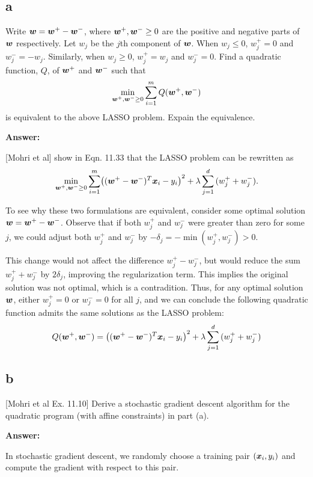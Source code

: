 \documentclass{article}
\begin{document}
\subsection{a}
Write $\bm{w} = \bm{w}^{+} - \bm{w}^{-}$, where $\bm{w}^{+}, \bm{w}^{-} \geq 0$ are the positive and negative parts of $\bm{w}$ respectively.
Let $w_j$ be the $j$th component of $\bm{w}$.
When $w_j \leq 0$, $w_j^{+} = 0$ and $w_j^{-} = -w_j$.
Similarly, when $w_j \geq 0$, $w_j^{+} = w_j$ and $w_j^{-} = 0$.
Find a quadratic function, $Q$, of $\bm{w}^{+}$ and $\bm{w}^{-}$ such that
$$\min_{\bm{w}^{+},\bm{w}^{-} \geq 0}\sum_{i=1}^m{Q(\bm{w}^{+}, \bm{w}^{-})}$$
is equivalent to the above LASSO problem.
Expain the equivalence.

\textbf{Answer:}

[Mohri et al] show in Eqn. 11.33 that the LASSO problem can be rewritten as
$$\min_{\vct{w}^{+},\vct{w}^{-} \geq 0}\sum_{i=1}^{m}\left((\vct{w}^{+} - \vct{w}^{-})^T\vct{x}_i - y_i\right)^2 + \lambda\sum_{j=1}^d{(w_j^{+} + w_j^{-})}.$$

To see why these two formulations are equivalent, consider some optimal solution $\bm{w} = \bm{w}^{+} - \bm{w}^{-}$.
Observe that if both $w^{+}_j$ and $w^{-}_j$ were greater than zero for some $j$, we could adjust both $w^{+}_j$ and $w^{-}_j$ by $-\delta_j = -\min(w^{+}_j, w^{-}_j) > 0$.

This change would not affect the difference $w^{+}_j - w^{-}_j$, but would reduce the sum $w^{+}_j + w^{-}_j$ by $2\delta_j$, improving the regularization term.
This implies the original solution was not optimal, which is a contradition.
Thus, for any optimal solution $\bm{w}$, either $w^{+}_j = 0$ or $w^{-}_j = 0$ for all $j$, and we can conclude the following quadratic function admits the same solutions as the LASSO problem:
$$Q(\vct{w}^{+}, \vct{w}^{-}) = \left((\vct{w}^{+} - \vct{w}^{-})^T\vct{x}_i - y_i\right)^2 + \lambda\sum_{j=1}^d{(w_j^{+} + w_j^{-})}$$

\subsection{b}
[Mohri et al Ex. 11.10] Derive a stochastic gradient descent algorithm for the quadratic program (with affine constraints) in part (a).

\textbf{Answer:}

In stochastic gradient descent, we randomly choose a training pair $(\bm{x}_i, y_i)$ and compute the gradient with respect to this pair.
\end{document}
